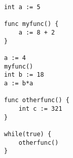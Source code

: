 \begin{lstlisting}[caption={Program structure where global scope work as main}, label={lf10}]
int a := 5

func myfunc() {
	a := 8 + 2
}

a := 4
myfunc()
int b := 18
a := b*a

func otherfunc() {
	int c := 321
}

while(true) {
	otherfunc()
}
\end{lstlisting}